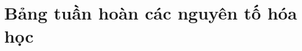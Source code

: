 \documentclass[Main_HOA10.tex]{subfiles}
\begin{document}
	\chapter{Bảng tuần hoàn các nguyên tố hóa học}
	
	
	
	
\end{document}
